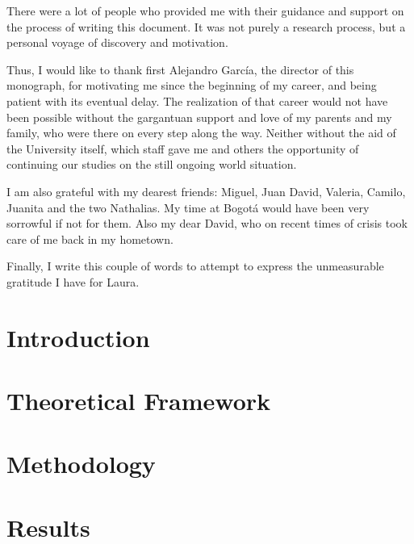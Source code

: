 \documentclass[12pt,letterpaper,oneside]{book}
\begin{document}
There were a lot of people who provided me with their guidance and support on the process of writing this document. 
It was not purely a research process, but a personal voyage of discovery and motivation. 

Thus, I would like to thank first Alejandro García, the director of this monograph, 
for motivating me since the beginning of my career, and being patient with its eventual delay. 
The realization of that career would not have been possible without the gargantuan support and love of my parents and my family, 
who were there on every step along the way.
Neither without the aid of the University itself, which staff gave me and others%
the opportunity of continuing our studies on the still ongoing world situation.

I am also grateful with my dearest friends: Miguel, Juan David, Valeria, Camilo, Juanita and the two Nathalias. 
My time at Bogotá would have been very sorrowful if not for them. 
Also my dear David, who on recent times of crisis took care of me back in my hometown.

Finally, I write this couple of words to attempt to express the unmeasurable gratitude I have for Laura.

\mainmatter

\tableofcontents

\newpage

\listoffigures
\listoftables
\listoflistings

\newpage

\visibleintentfalse

\chapter{Introduction}

	
\chapter{Theoretical Framework}


\chapter{Methodology}


\chapter{Results}

\end{document}

